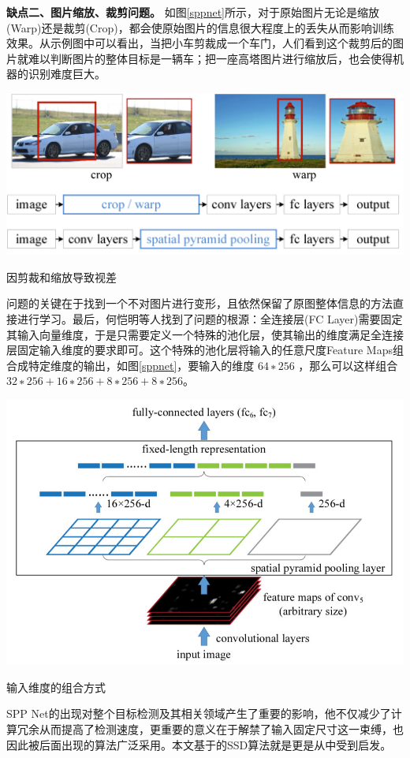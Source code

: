 \textbf{缺点二、图片缩放、裁剪问题。}
如图\ref{sppnet}所示，对于原始图片无论是缩放(Warp)还是裁剪(Crop)，都会使原始图片的信息很大程度上的丢失从而影响训练效果。从示例图中可以看出，当把小车剪裁成一个车门，人们看到这个裁剪后的图片就难以判断图片的整体目标是一辆车；把一座高塔图片进行缩放后，也会使得机器的识别难度巨大。
\begin{uscfigure}
	\includegraphics[width=\textwidth]{./Pictures/sppnet_crop_warp.jpg}	
	\caption{因剪裁和缩放导致视差}
	\label{sppnet}
\end{uscfigure}
问题的关键在于找到一个不对图片进行变形，且依然保留了原图整体信息的方法直接进行学习。最后，何恺明等人找到了问题的根源：全连接层(FC Layer)需要固定其输入向量维度，于是只需要定义一个特殊的池化层，使其输出的维度满足全连接层固定输入维度的要求即可。这个特殊的池化层将输入的任意尺度Feature Maps组合成特定维度的输出，如图\ref{sppnet}，要输入的维度 $64∗256$ ，那么可以这样组合 $32∗256+16∗256+8∗256+8∗256$。
\begin{uscfigure}
	\includegraphics[width=\textwidth,]{./Pictures/sppnet_pool_layer.jpg}	
	\caption{输入维度的组合方式}
	\label{sppnet}
\end{uscfigure}
SPP Net的出现对整个目标检测及其相关领域产生了重要的影响，他不仅减少了计算冗余从而提高了检测速度，更重要的意义在于解禁了输入固定尺寸这一束缚，也因此被后面出现的算法广泛采用。本文基于的SSD算法就是更是从中受到启发。

